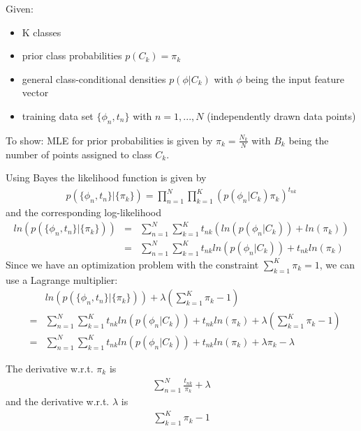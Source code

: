 \documentclass{article}
\begin{document}
Given:
\begin{itemize}
\item K classes
\item prior class probabilities $p(C_k)=\pi_k$
\item general class-conditional densities $p(\phi|C_k)$ with $\phi$ being the input feature vector
\item training data set $\{\phi_n, t_n\}$ with $n = 1,...,N$ (independently drawn data points)
\end{itemize}

To show: MLE for prior probabilities is given by $\pi_k = \frac{N_k}{N}$ with $B_k$ being the number of points assigned to class $C_k$.

Using Bayes the likelihood function is given by
\begin{eqnarray}
p(\{\phi_n, t_n\} | \{\pi_k\}) = \prod_{n=1}^N \prod_{k=1}^K (p(\phi_n | C_k) \pi_k)^{t_{nk}}
\end{eqnarray}
and the corresponding log-likelihood
\begin{eqnarray}
ln(p(\{\phi_n, t_n\} | \{\pi_k\}))&=&\sum_{n=1}^N \sum_{k=1}^K t_{nk} (ln(p(\phi_n | C_k)) + ln(\pi_k))\\
&=& \sum_{n=1}^N \sum_{k=1}^K t_{nk} ln(p(\phi_n | C_k)) + t_{nk} ln(\pi_k)
\end{eqnarray}
Since we have an optimization problem with the constraint $\sum_{k=1}^K \pi_k = 1$, we can use a Lagrange multiplier:
\begin{eqnarray}
&&ln(p(\{\phi_n, t_n\} | \{\pi_k\})) + \lambda\left(\sum_{k=1}^K \pi_k - 1\right)\\
&=& \sum_{n=1}^N \sum_{k=1}^K t_{nk} ln(p(\phi_n | C_k)) + t_{nk} ln(\pi_k) + \lambda\left(\sum_{k=1}^K \pi_k - 1\right)\\
&=& \sum_{n=1}^N \sum_{k=1}^K t_{nk} ln(p(\phi_n | C_k)) + t_{nk} ln(\pi_k) + \lambda\pi_k - \lambda
\end{eqnarray}

The derivative w.r.t. $\pi_k$ is
\begin{eqnarray}
\sum_{n=1}^N  \frac{t_{nk}}{\pi_k} + \lambda
\end{eqnarray}
and the derivative w.r.t. $\lambda$ is
\begin{eqnarray}
\sum_{k=1}^K \pi_k - 1
\end{eqnarray}
\end{document}
